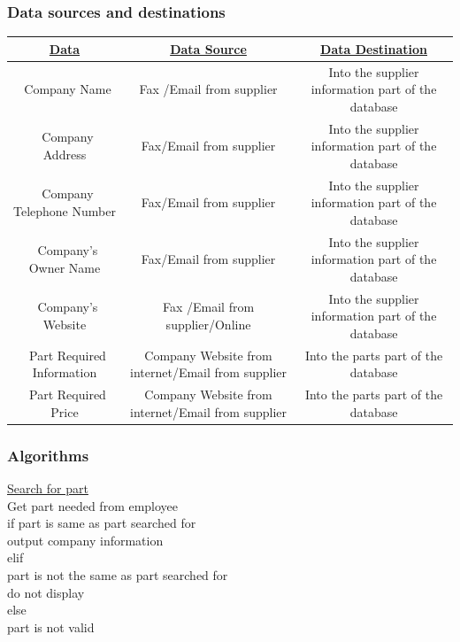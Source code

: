 \subsubsection{Data sources and destinations}
\begin{center}
\begin{tabular}{ |c|c|c| } 
\hline
\bf\underline{Data}                                                                                                      & \bf\underline{Data Source} & \bf\underline{Data Destination}

\\
\hline
\ Company Name & Fax /Email from supplier & Into the supplier information part of the database\\
\hline
\ Company Address & Fax/Email from supplier & Into the supplier information part of the database\\ 
\hline
\ Company Telephone Number & Fax/Email from supplier &Into the supplier information part of the database\\
\hline
\ Company's Owner Name & Fax/Email from supplier & Into the supplier information part of the database\\
\hline
\ Company's Website & Fax /Email from supplier/Online &Into the supplier information part of the database\\
\hline
\ Part Required Information & Company Website from internet/Email from supplier & Into the parts part of the database\\
\hline
\ Part Required Price & Company Website from internet/Email from supplier & Into the parts part of the database\\
\hline
\end{tabular}
\end{center}
\subsubsection{Algorithms}

\underline{Search for part}\\
Get part needed from employee\\
if part is same as part searched for\\
output company information\\
elif\\
part is not the same as part searched for\\
do not display\\
else\\
part is not valid

